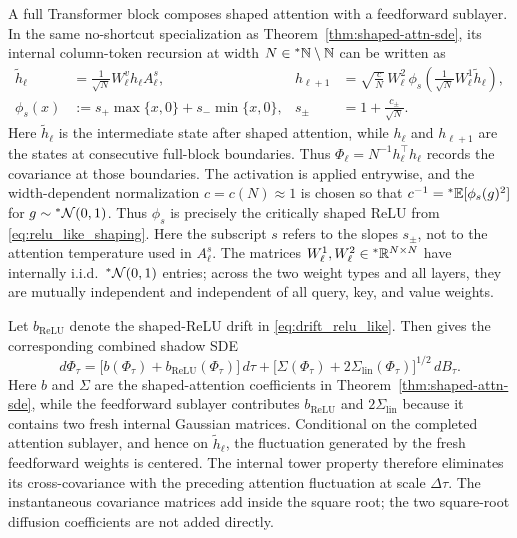 \begin{remark}
\label{rem:full-transformer-blocks}
A full Transformer block composes shaped attention with a feedforward sublayer. In the same no-shortcut specialization as Theorem~\ref{thm:shaped-attn-sde}, its internal column-token recursion at width $N \in {}^*\mathbb{N} \setminus \mathbb{N}$ can be written as
\begin{equation}
\label{eq:ch6-full-block-rec}
\begin{aligned}
\widetilde{h}_\ell &= \frac{1}{\sqrt{N}} W_\ell^v h_\ell A_\ell^s, &
h_{\ell+1} &= \sqrt{\frac{c}{N}}\,W_\ell^2\,\phi_s\!\left(\frac{1}{\sqrt{N}} W_\ell^1 \widetilde{h}_\ell\right), \\
\phi_s(x) &:= s_+ \max\{x, 0\} + s_- \min\{x, 0\}, &
s_\pm &= 1 + \frac{c_\pm}{\sqrt{N}}.
\end{aligned}
\end{equation}
Here $\widetilde{h}_\ell$ is the intermediate state after shaped attention, while $h_\ell$ and $h_{\ell+1}$ are the states at consecutive full-block boundaries. Thus $\Phi_\ell = N^{-1} h_\ell^\top h_\ell$ records the covariance at those boundaries. The activation is applied entrywise, and the width-dependent normalization $c = c(N) \approx 1$ is chosen so that $c^{-1} = {}^*\mathbb{E}[\phi_s(g)^2]$ for $g \sim {}^*\mathcal{N}(0, 1)$. Thus $\phi_s$ is precisely the critically shaped ReLU from \eqref{eq:relu_like_shaping}.
Here the subscript $s$ refers to the slopes $s_\pm$, not to the attention temperature used in $A_\ell^s$. The matrices $W_\ell^1, W_\ell^2 \in {}^*\mathbb{R}^{N \times N}$ have internally i.i.d.\ ${}^*\mathcal{N}(0, 1)$ entries; across the two weight types and all layers, they are mutually independent and independent of all query, key, and value weights.

Let $b_{\mathrm{ReLU}}$ denote the shaped-ReLU drift in \eqref{eq:drift_relu_like}.
Then \cite[Theorem 3.2 and Corollary 4.3]{noci2023shaped} gives the corresponding combined shadow SDE
\begin{equation}
\label{eq:ch6-full-block-sde}
d\Phi_\tau = \bigl[b(\Phi_\tau) + b_{\mathrm{ReLU}}(\Phi_\tau)\bigr]\,d\tau + \bigl[\Sigma(\Phi_\tau) + 2\Sigma_{\mathrm{lin}}(\Phi_\tau)\bigr]^{1/2}\,dB_\tau.
\end{equation}
Here $b$ and $\Sigma$ are the shaped-attention coefficients in Theorem~\ref{thm:shaped-attn-sde}, while the feedforward sublayer contributes $b_{\mathrm{ReLU}}$ and $2\Sigma_{\mathrm{lin}}$ because it contains two fresh internal Gaussian matrices. Conditional on the completed attention sublayer, and hence on $\widetilde{h}_\ell$, the fluctuation generated by the fresh feedforward weights is centered. The internal tower property therefore eliminates its cross-covariance with the preceding attention fluctuation at scale $\Delta\tau$. The instantaneous covariance matrices add inside the square root; the two square-root diffusion coefficients are not added directly.
\end{remark}

